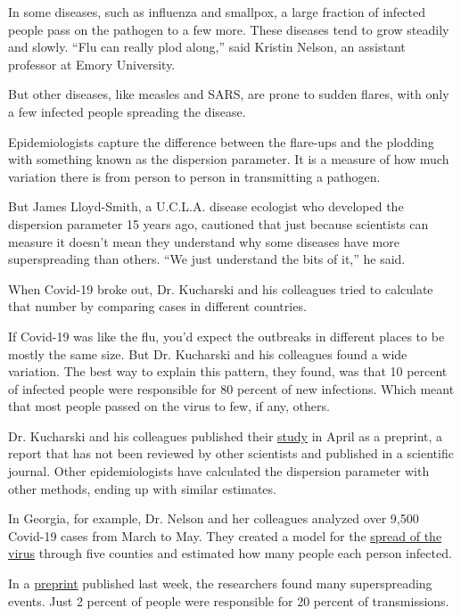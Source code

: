 In some diseases, such as influenza and smallpox, a large fraction of
infected people pass on the pathogen to a few more. These diseases tend
to grow steadily and slowly. ``Flu can really plod along,'' said Kristin
Nelson, an assistant professor at Emory University.

But other diseases, like measles and SARS, are prone to sudden flares,
with only a few infected people spreading the disease.

Epidemiologists capture the difference between the flare-ups and the
plodding with something known as the dispersion parameter. It is a
measure of how much variation there is from person to person in
transmitting a pathogen.

But James Lloyd-Smith, a U.C.L.A. disease ecologist who developed the
dispersion parameter 15 years ago, cautioned that just because
scientists can measure it doesn't mean they understand why some diseases
have more superspreading than others. ``We just understand the bits of
it,'' he said.

When Covid-19 broke out, Dr. Kucharski and his colleagues tried to
calculate that number by comparing cases in different countries.

If Covid-19 was like the flu, you'd expect the outbreaks in different
places to be mostly the same size. But Dr. Kucharski and his colleagues
found a wide variation. The best way to explain this pattern, they
found, was that 10 percent of infected people were responsible for 80
percent of new infections. Which meant that most people passed on the
virus to few, if any, others.

Dr. Kucharski and his colleagues published their
\href{https://wellcomeopenresearch.org/articles/5-67}{study} in April as
a preprint, a report that has not been reviewed by other scientists and
published in a scientific journal. Other epidemiologists have calculated
the dispersion parameter with other methods, ending up with similar
estimates.

In Georgia, for example, Dr. Nelson and her colleagues analyzed over
9,500 Covid-19 cases from March to May. They created a model for the
\href{https://www.nytimes3xbfgragh.onion/2020/07/21/health/coronavirus-infections-us.html}{spread
of the virus} through five counties and estimated how many people each
person infected.

In a
\href{https://www.medrxiv.org/content/10.1101/2020.06.20.20130476v2}{preprint}
published last week, the researchers found many superspreading events.
Just 2 percent of people were responsible for 20 percent of
transmissions.

